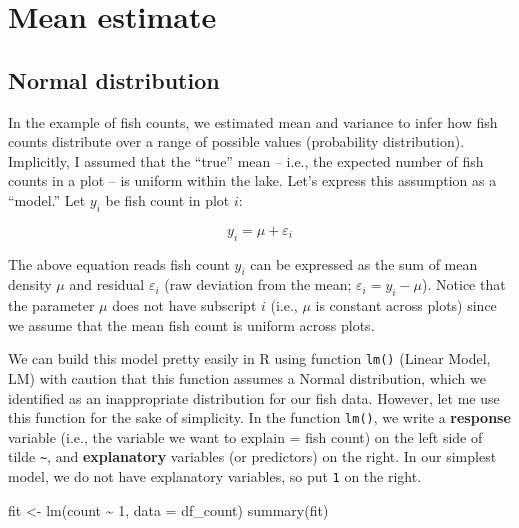 \documentclass[
]{book}
\newenvironment{Shaded}{\begin{snugshade}}{\end{snugshade}}
\newcommand{\AttributeTok}[1]{\textcolor[rgb]{0.77,0.63,0.00}{#1}}
\newcommand{\DecValTok}[1]{\textcolor[rgb]{0.00,0.00,0.81}{#1}}
\newcommand{\FunctionTok}[1]{\textcolor[rgb]{0.00,0.00,0.00}{#1}}
\newcommand{\NormalTok}[1]{#1}
\newcommand{\OtherTok}[1]{\textcolor[rgb]{0.56,0.35,0.01}{#1}}
\newcommand{\SpecialCharTok}[1]{\textcolor[rgb]{0.00,0.00,0.00}{#1}}
\begin{document}
\hypertarget{mean-estimate}{%
\section{Mean estimate}\label{mean-estimate}}

\hypertarget{normal-distribution}{%
\subsection{Normal distribution}\label{normal-distribution}}

In the example of fish counts, we estimated mean and variance to infer how fish counts distribute over a range of possible values (probability distribution). Implicitly, I assumed that the ``true'' mean -- i.e., the expected number of fish counts in a plot -- is uniform within the lake. Let's express this assumption as a ``model.'' Let \(y_i\) be fish count in plot \(i\):

\[
y_i = \mu + \varepsilon_i
\]

The above equation reads fish count \(y_i\) can be expressed as the sum of mean density \(\mu\) and residual \(\varepsilon_i\) (raw deviation from the mean; \(\varepsilon_i = y_i - \mu\)). Notice that the parameter \(\mu\) does not have subscript \(i\) (i.e., \(\mu\) is constant across plots) since we assume that the mean fish count is uniform across plots.

We can build this model pretty easily in R using function \texttt{lm()} (Linear Model, LM) with caution that this function assumes a Normal distribution, which we identified as an inappropriate distribution for our fish data. However, let me use this function for the sake of simplicity. In the function \texttt{lm()}, we write a \textbf{response} variable (i.e., the variable we want to explain = fish count) on the left side of tilde \texttt{\textasciitilde{}}, and \textbf{explanatory} variables (or predictors) on the right. In our simplest model, we do not have explanatory variables, so put \texttt{1} on the right.

\begin{Shaded}
\begin{Highlighting}[]
\NormalTok{fit }\OtherTok{\textless{}{-}} \FunctionTok{lm}\NormalTok{(count }\SpecialCharTok{\textasciitilde{}} \DecValTok{1}\NormalTok{, }\AttributeTok{data =}\NormalTok{ df\_count)}
\FunctionTok{summary}\NormalTok{(fit)}
\end{Highlighting}
\end{Shaded}
\end{document}
